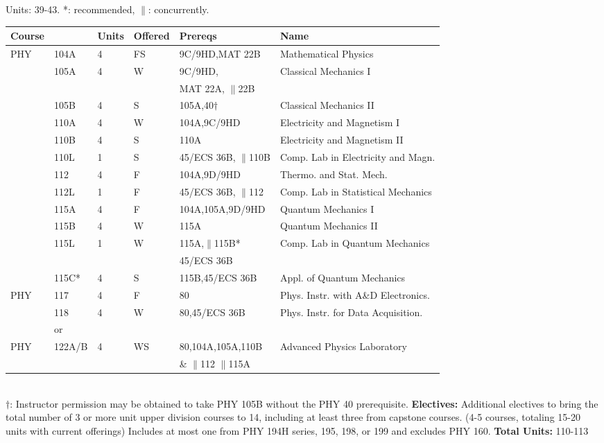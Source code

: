 \documentclass[12pt]{article}
\begin{document}
\newpage
\vskip 2cm
\vskip 0.5cm
\noindent
Units:  39-43. *: recommended, $\parallel$: concurrently.\\
\begin{tabular}{|llllll|}
\hline
Course & & Units & Offered & Prereqs & Name \\
\hline

PHY & 104A & 4 & FS & 9C/9HD,MAT 22B   & Mathematical Physics \\ 
    & 105A & 4 & W & 9C/9HD, & Classical Mechanics I\\
    &      &   &   & MAT 22A, $\parallel$22B & \\
    & 105B & 4 & S & 105A,40$\dagger$          & Classical Mechanics II\\ 
    & 110A & 4 & W & 104A,9C/9HD             & Electricity and Magnetism I\\
    & 110B & 4 & S & 110A                     & Electricity and Magnetism II\\
    & 110L & 1 & S & 45/ECS 36B, $\parallel$110B & Comp. Lab in Electricity and Magn. \\
    & 112  & 4 & F & 104A,9D/9HD      & Thermo. and Stat. Mech.\\    
    & 112L & 1 & F & 45/ECS 36B, $\parallel$112  & Comp. Lab in Statistical Mechanics \\ 
    & 115A & 4 & F & 104A,105A,9D/9HD & Quantum Mechanics I \\
    & 115B & 4 & W & 115A             & Quantum Mechanics II \\
    & 115L & 1 & W & 115A,$\parallel$115B*  & Comp. Lab in Quantum Mechanics \\
           & & & & 45/ECS 36B & \\
    & 115C* & 4 & S & 115B,45/ECS 36B& Appl. of Quantum Mechanics\\ 
\hline
\hline
PHY & 117 & 4 &  F & 80              & Phys. Instr. with A\&D Electronics.  \\
    & 118 & 4 &  W & 80,45/ECS 36B   & Phys. Instr. for Data Acquisition. \\ 
\hline
    & or & & & & \\
\hline
PHY & 122A/B & 4 & WS & 80,104A,105A,110B & Advanced Physics Laboratory \\  
    &  & & & \& $\parallel$112 $\parallel$115A&  \\  
\hline
\end{tabular}\\ 
\noindent
$\dagger$:  Instructor permission may be obtained to take PHY 105B without the PHY 40 prerequisite.
\noindent
{\bf Electives:} Additional electives to bring the total number of 3
or more unit upper division courses to 14, including at least three
from capstone courses.  (4-5 courses, totaling 15-20 units with
current offerings) Includes at most one from PHY 194H series, 195, 198, or 199
and excludes PHY 160.
\noindent
{\bf Total Units:} 110-113
\end{document}
